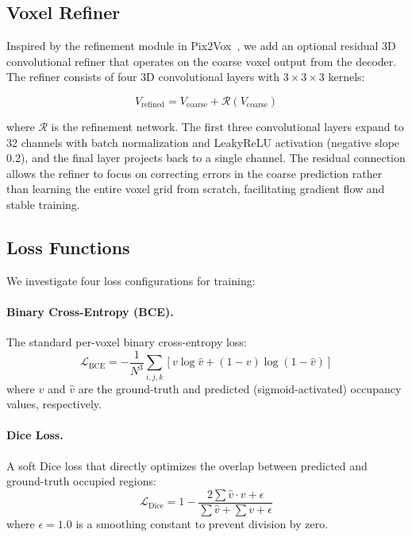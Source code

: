 \documentclass[10pt,twocolumn,letterpaper]{article}
\begin{document}
\subsection{Voxel Refiner}

Inspired by the refinement module in Pix2Vox~\cite{xie2019pix2vox}, we add an optional residual 3D convolutional refiner that operates on the coarse voxel output from the decoder. The refiner consists of four 3D convolutional layers with $3 \times 3 \times 3$ kernels:

\begin{equation}
V_{\text{refined}} = V_{\text{coarse}} + \mathcal{R}(V_{\text{coarse}})
\end{equation}

where $\mathcal{R}$ is the refinement network. The first three convolutional layers expand to 32 channels with batch normalization and LeakyReLU activation (negative slope 0.2), and the final layer projects back to a single channel. The residual connection allows the refiner to focus on correcting errors in the coarse prediction rather than learning the entire voxel grid from scratch, facilitating gradient flow and stable training.

\subsection{Loss Functions}

We investigate four loss configurations for training:

\paragraph{Binary Cross-Entropy (BCE).} The standard per-voxel binary cross-entropy loss:
\begin{equation}
\mathcal{L}_{\text{BCE}} = -\frac{1}{N^3} \sum_{i,j,k} \left[ v \log \hat{v} + (1-v) \log(1-\hat{v}) \right]
\end{equation}
where $v$ and $\hat{v}$ are the ground-truth and predicted (sigmoid-activated) occupancy values, respectively.

\paragraph{Dice Loss.} A soft Dice loss that directly optimizes the overlap between predicted and ground-truth occupied regions:
\begin{equation}
\mathcal{L}_{\text{Dice}} = 1 - \frac{2 \sum \hat{v} \cdot v + \epsilon}{\sum \hat{v} + \sum v + \epsilon}
\end{equation}
where $\epsilon = 1.0$ is a smoothing constant to prevent division by zero.
\end{document}
